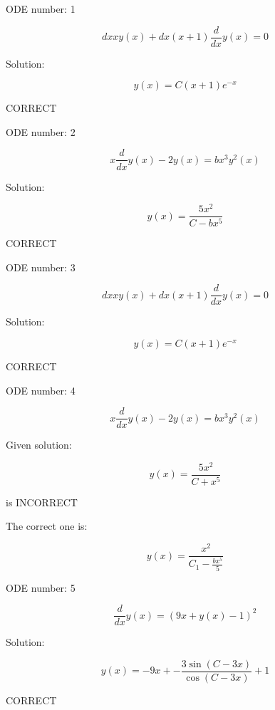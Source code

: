 \documentclass{article}
\begin{document}
        
ODE number: 1

$$
 dx x y{\left (x \right )} + dx \left(x + 1\right) \frac{d}{d x} y{\left (x \right )} = 0 
$$

Solution:

$$
 y{\left (x \right )} = C \left(x + 1\right) e^{- x} 
$$

CORRECT

ODE number: 2

$$
 x \frac{d}{d x} y{\left (x \right )} - 2 y{\left (x \right )} = b x^{3} y^{2}{\left (x \right )} 
$$

Solution:

$$
 y{\left (x \right )} = \frac{5 x^{2}}{C - b x^{5}} 
$$

CORRECT

ODE number: 3

$$
 dx x y{\left (x \right )} + dx \left(x + 1\right) \frac{d}{d x} y{\left (x \right )} = 0 
$$

Solution:

$$
 y{\left (x \right )} = C \left(x + 1\right) e^{- x} 
$$

CORRECT

ODE number: 4

$$
 x \frac{d}{d x} y{\left (x \right )} - 2 y{\left (x \right )} = b x^{3} y^{2}{\left (x \right )} 
$$

Given solution:

$$
 y{\left (x \right )} = \frac{5 x^{2}}{C + x^{5}} 
$$

 is INCORRECT

The correct one is:

$$
 y{\left (x \right )} = \frac{x^{2}}{C_{1} - \frac{b x^{5}}{5}} 
$$

ODE number: 5

$$
 \frac{d}{d x} y{\left (x \right )} = \left(9 x + y{\left (x \right )} - 1\right)^{2} 
$$

Solution:

$$
 y{\left (x \right )} = - 9 x + - \frac{3 \sin{\left (C - 3 x \right )}}{\cos{\left (C - 3 x \right )}} + 1 
$$

CORRECT
\end{document}
